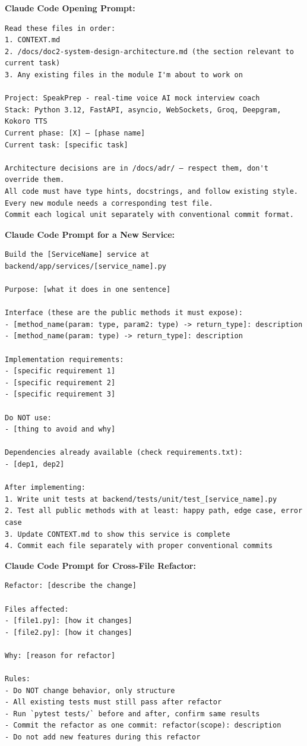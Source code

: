 \documentclass[
  11pt,
]{article}
\begin{document}
\textbf{Claude Code Opening Prompt:}

\begin{lstlisting}
Read these files in order:
1. CONTEXT.md
2. /docs/doc2-system-design-architecture.md (the section relevant to current task)
3. Any existing files in the module I'm about to work on

Project: SpeakPrep - real-time voice AI mock interview coach
Stack: Python 3.12, FastAPI, asyncio, WebSockets, Groq, Deepgram, Kokoro TTS
Current phase: [X] — [phase name]
Current task: [specific task]

Architecture decisions are in /docs/adr/ — respect them, don't override them.
All code must have type hints, docstrings, and follow existing style.
Every new module needs a corresponding test file.
Commit each logical unit separately with conventional commit format.
\end{lstlisting}

\textbf{Claude Code Prompt for a New Service:}

\begin{lstlisting}
Build the [ServiceName] service at backend/app/services/[service_name].py

Purpose: [what it does in one sentence]

Interface (these are the public methods it must expose):
- [method_name(param: type, param2: type) -> return_type]: description
- [method_name(param: type) -> return_type]: description

Implementation requirements:
- [specific requirement 1]
- [specific requirement 2]
- [specific requirement 3]

Do NOT use:
- [thing to avoid and why]

Dependencies already available (check requirements.txt):
- [dep1, dep2]

After implementing:
1. Write unit tests at backend/tests/unit/test_[service_name].py
2. Test all public methods with at least: happy path, edge case, error case
3. Update CONTEXT.md to show this service is complete
4. Commit each file separately with proper conventional commits
\end{lstlisting}

\textbf{Claude Code Prompt for Cross-File Refactor:}

\begin{lstlisting}
Refactor: [describe the change]

Files affected:
- [file1.py]: [how it changes]
- [file2.py]: [how it changes]

Why: [reason for refactor]

Rules:
- Do NOT change behavior, only structure
- All existing tests must still pass after refactor
- Run `pytest tests/` before and after, confirm same results
- Commit the refactor as one commit: refactor(scope): description
- Do not add new features during this refactor
\end{lstlisting}
\end{document}
